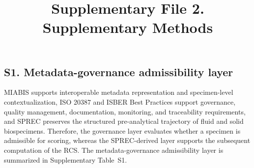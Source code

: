 \documentclass[preprint,12pt]{elsarticle}
\begin{document}
\begin{frontmatter}
\title{Supplementary File 2. Supplementary Methods}
\end{frontmatter}

\subsection*{S1. Metadata-governance admissibility layer}

MIABIS supports interoperable metadata representation and specimen-level contextualization, ISO 20387 and ISBER Best Practices support governance, quality management, documentation, monitoring, and traceability requirements, and SPREC preserves the structured pre-analytical trajectory of fluid and solid biospecimens. Therefore, the governance layer evaluates whether a specimen is admissible for scoring, whereas the SPREC-derived layer supports the subsequent computation of the RCS. The metadata-governance admissibility layer is summarized in Supplementary Table~S1.
\end{document}
